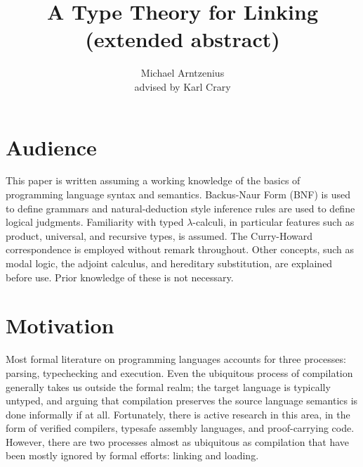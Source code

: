 \documentclass[11pt]{article}
\title{A Type Theory for Linking\\{\large (extended abstract)}}
\author{Michael Arntzenius\\advised by Karl Crary}
\newcommand{\bscolor}{blue}
\newcommand{\bs}[1]{\textcolor{\bscolor}{#1}}
\begin{document}
\maketitle



\section{Audience}

This paper is written assuming a working knowledge of the basics of programming
language syntax and semantics. Backus-Naur Form (BNF) is used to define grammars
and natural-deduction style inference rules are used to define logical
judgments. Familiarity with typed $\lambda$-calculi, in particular features such
as product, universal, and recursive types, is assumed. The Curry-Howard
correspondence is employed without remark throughout. Other concepts, such as
modal logic, the adjoint calculus, and hereditary substitution, are explained
before use. Prior knowledge of these is not necessary.





\section{Motivation}

Most formal literature on programming languages accounts for three processes:
parsing, typechecking and execution. Even the ubiquitous process of compilation
generally takes us outside the formal realm; the target language is typically
untyped, and arguing that compilation preserves the source language semantics is
done informally if at all. Fortunately, there is active research in this area,
in the form of verified compilers, typesafe assembly languages, and
proof-carrying code. However, there are two processes almost as ubiquitous as
compilation that have been mostly ignored by formal efforts: linking and
loading.
\end{document}
